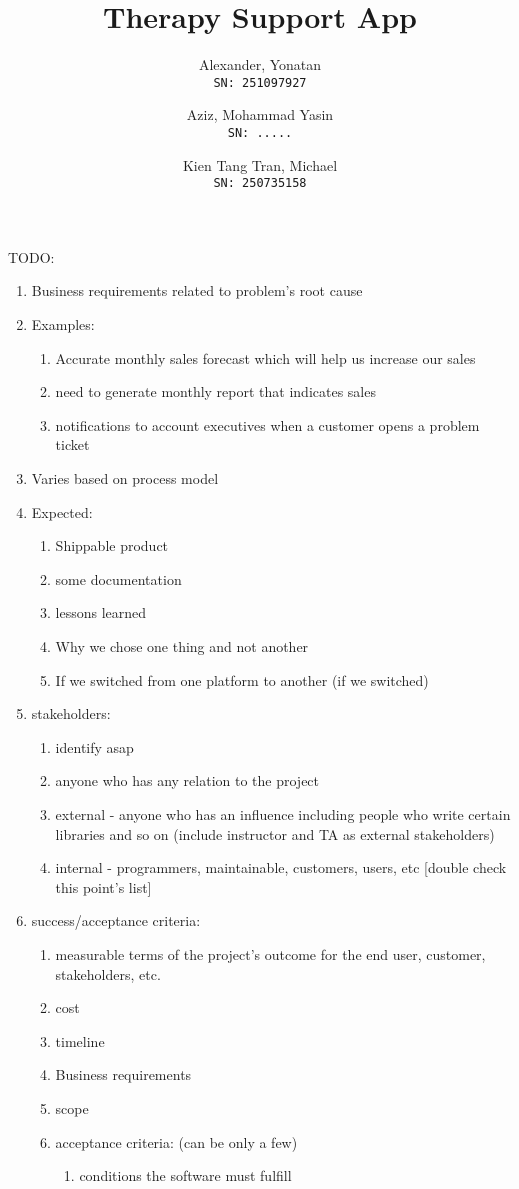 \documentclass[11pt]{article}
\author{Alexander, Yonatan\\
\texttt{SN: 251097927}
\and
Aziz, Mohammad Yasin\\
\texttt{SN: .....}
\and
Kien Tang Tran, Michael\\
\texttt{SN: 250735158}
}
\title{Therapy Support App}
\begin{document}
    TODO:

    \begin{enumerate}
        \item Business requirements related to problem's root cause
        \item Examples:
        \begin{enumerate}
            \item Accurate monthly sales forecast which will help us increase our sales
            \item need to generate monthly report that indicates sales
            \item notifications to account executives when a customer opens a problem ticket
        \end{enumerate}
        \item Varies based on process model
        \item Expected:
        \begin{enumerate}
            \item Shippable product
            \item some documentation
            \item lessons learned
            \item Why we chose one thing and not another
            \item If we switched from one platform to another (if we switched)
        \end{enumerate}
        \item stakeholders:
        \begin{enumerate}
            \item identify asap
            \item anyone who has any relation to the project
            \item external - anyone who has an influence\; including people who write certain libraries and so on  (include instructor and TA as external stakeholders)
            \item internal - programmers, maintainable, customers, users, etc [double check this point's list]
        \end{enumerate}
        \item success/acceptance criteria:
        \begin{enumerate}
            \item measurable terms of the project's outcome for the end user, customer, stakeholders, etc.
            \item cost
            \item timeline
            \item Business requirements
            \item scope
            \item acceptance criteria: (can be only a few)
            \begin{enumerate}
                \item conditions the software must fulfill
            \end{enumerate}
        \end{enumerate}
    \end{enumerate}
\end{document}
